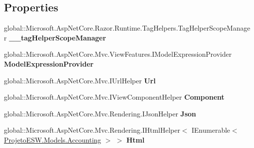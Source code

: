\subsection*{Properties}
\begin{DoxyCompactItemize}
\item 
\mbox{\label{class_asp_net_core_1_1_views___accountings___index_a2f1f94ad1ba282b7eef3185d9f09552f}} 
global\+::\+Microsoft.\+Asp\+Net\+Core.\+Razor.\+Runtime.\+Tag\+Helpers.\+Tag\+Helper\+Scope\+Manager {\bfseries \+\_\+\+\_\+tag\+Helper\+Scope\+Manager}
\item 
\mbox{\label{class_asp_net_core_1_1_views___accountings___index_ac618f23f3c6dce0af94593462e8ebe0c}} 
global\+::\+Microsoft.\+Asp\+Net\+Core.\+Mvc.\+View\+Features.\+I\+Model\+Expression\+Provider {\bfseries Model\+Expression\+Provider}
\item 
\mbox{\label{class_asp_net_core_1_1_views___accountings___index_a81e623634c059dd38b7f1e599322c7fa}} 
global\+::\+Microsoft.\+Asp\+Net\+Core.\+Mvc.\+I\+Url\+Helper {\bfseries Url}
\item 
\mbox{\label{class_asp_net_core_1_1_views___accountings___index_a9bd3771fbcdb0830e40f26cd5bd43c30}} 
global\+::\+Microsoft.\+Asp\+Net\+Core.\+Mvc.\+I\+View\+Component\+Helper {\bfseries Component}
\item 
\mbox{\label{class_asp_net_core_1_1_views___accountings___index_a20a4b2ec415e9753650a48bd329f2dfe}} 
global\+::\+Microsoft.\+Asp\+Net\+Core.\+Mvc.\+Rendering.\+I\+Json\+Helper {\bfseries Json}
\item 
\mbox{\label{class_asp_net_core_1_1_views___accountings___index_adcd4c2928c699acd46a5889b8768677a}} 
global\+::\+Microsoft.\+Asp\+Net\+Core.\+Mvc.\+Rendering.\+I\+Html\+Helper$<$ I\+Enumerable$<$ \mbox{\hyperlink{class_projeto_e_s_w_1_1_models_1_1_accounting}{Projeto\+E\+S\+W.\+Models.\+Accounting}} $>$ $>$ {\bfseries Html}
\end{DoxyCompactItemize}
